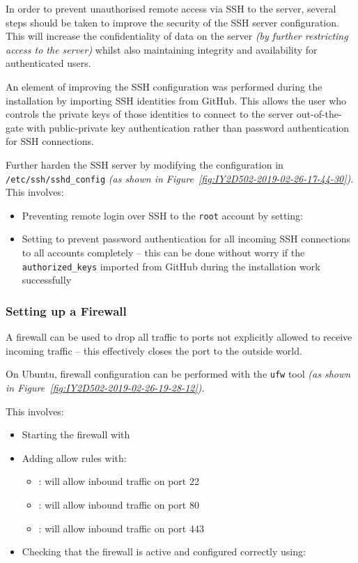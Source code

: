 In order to prevent unauthorised remote access via SSH to the server, several steps should be taken to improve the security of the SSH server configuration. This will increase the confidentiality of data on the server \textit{(by further restricting access to the server)} whilst also maintaining integrity and availability for authenticated users.

An element of improving the SSH configuration was performed during the installation by importing SSH identities from GitHub. This allows the user who controls the private keys of those identities to connect to the server out-of-the-gate with public-private key authentication rather than password authentication for SSH connections.

Further harden the SSH server by modifying the configuration in \texttt{/etc/ssh/sshd\_config} \textit{(as shown in Figure~\ref{fig:IY2D502-2019-02-26-17-44-30})}. This involves:
\begin{itemize}
  \item Preventing remote login over SSH to the \texttt{root} account by setting:\\
  \item Setting  to prevent password authentication for all incoming SSH connections to all accounts completely -- this can be done without worry if the \texttt{authorized\_keys} imported from GitHub during the installation work successfully
\end{itemize}

\subsubsection{Setting up a Firewall}
\label{sec:hardening:firewall}
A firewall can be used to drop all traffic to ports not explicitly allowed to receive incoming traffic -- this effectively closes the port to the outside world.

On Ubuntu, firewall configuration can be performed with the \texttt{ufw} tool \textit{(as shown in Figure~\ref{fig:IY2D502-2019-02-26-19-28-12})}.

This involves:
\begin{itemize}
  \item Starting the firewall with 
  \item Adding allow rules with:
    \begin{itemize}
      \item {}: will allow inbound traffic on port 22
      \item {}: will allow inbound traffic on port 80
      \item {}: will allow inbound traffic on port 443
    \end{itemize}
  \item Checking that the firewall is active and configured correctly using:\\
\end{itemize}

